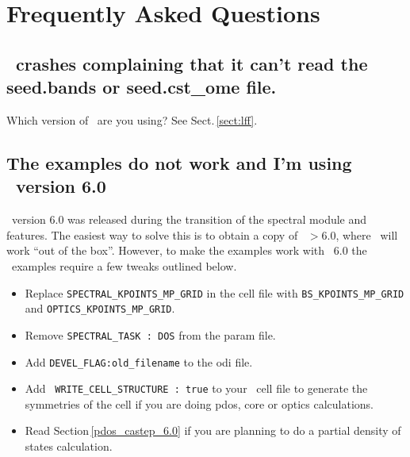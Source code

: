 \documentclass[a4paper,11pt,twoside]{book}
\begin{document}
{%





\chapter{Frequently Asked Questions}

\section{\optados\ crashes complaining that it can't read the
  seed.bands or seed.cst\_ome file.}
Which version of \castep\ are you using? See Sect.\,\ref{sect:lff}.

\section{The examples do not work and I'm using \castep\ version 6.0}
\castep\ version 6.0 was released during the transition of the spectral module and features. The easiest way to solve this is to obtain a  copy of \castep\ $>6.0$, where \optados\ will work ``out of the box''.  However, to make the examples work with \castep\ 6.0 the \optados\ examples require a few tweaks outlined below.
\begin{itemize}
\item Replace \verb#SPECTRAL_KPOINTS_MP_GRID# in the cell file with \verb#BS_KPOINTS_MP_GRID# and \verb#OPTICS_KPOINTS_MP_GRID#.
\item Remove \verb#SPECTRAL_TASK : DOS# from the param file.
\item Add \verb#DEVEL_FLAG:old_filename# to the odi file.
\item Add \verb# WRITE_CELL_STRUCTURE : true# to your \castep\ cell file to generate the symmetries of the cell if you are doing pdos, core or optics calculations.
\item Read Section\,\ref{pdos_castep_6.0} if you are planning to do a partial density of states calculation.
\end{itemize}

}
\end{document}
